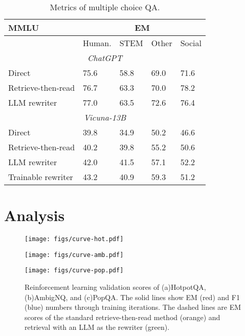 \begin{table}[tbh]
	\centering\small
	{\begin{tabular}{p{2.8cm}p{0.7cm}p{0.6cm}p{0.6cm}p{0.6cm}}
		\toprule
            \textbf{MMLU} & \multicolumn{4}{c}{\textbf{EM}}\\
             \midrule
             &Human. &STEM & Other & Social \\
             \midrule
             \multicolumn{5}{c}{\emph{ChatGPT}} \\
            Direct &75.6 &58.8 & 69.0 &71.6 \\
            Retrieve-then-read & 76.7 &63.3 &70.0 &78.2 \\
            LLM rewriter &77.0 &63.5 &72.6 & 76.4\\
            \midrule
            \multicolumn{5}{c}{\emph{Vicuna-13B}} \\
            Direct &39.8 &34.9 & 50.2 &46.6 \\
            Retrieve-then-read & 40.2 &39.8 &55.2 &50.6 \\
            LLM rewriter &42.0 &41.5 &57.1  & 52.2\\
            Trainable rewriter &43.2 & 40.9& 59.3 & 51.2\\
            
		\bottomrule
	\end{tabular}
	}
        \caption{Metrics of multiple choice QA.}
	\label{mainmc}
 \vspace{-1.2em}
\end{table}

\section{Analysis}

\begin{figure}[tbh]     
 \vspace{-1em}
    \centering      
        \begin{minipage}{0.49\textwidth}    
            \centering      
            \texttt{[image: figs/curve-hot.pdf]}
        \end{minipage}            
        \begin{minipage}{0.49\textwidth}
            \centering      
            \texttt{[image: figs/curve-amb.pdf]}      
        \end{minipage}     
        \begin{minipage}{0.49\textwidth}
            \centering      
            \texttt{[image: figs/curve-pop.pdf]}      
        \end{minipage}    
    \caption{Reinforcement learning validation scores of (a)HotpotQA, (b)AmbigNQ, and (c)PopQA.  The solid lines show EM (red) and F1 (blue) numbers through training iterations. The dashed lines are EM scores of the standard retrieve-then-read method (orange) and retrieval with an LLM as the rewriter (green).}
    \label{curves}
 \vspace{-1.5em}
\end{figure} 
